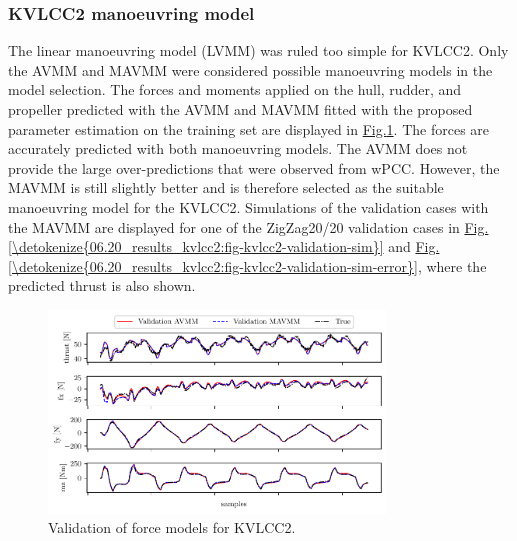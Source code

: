 \subsubsection{KVLCC2 manoeuvring model}
\label{\detokenize{06.20_results_kvlcc2:kvlcc2-manoeuvring-model}}
The linear manoeuvring model (LVMM) was ruled too simple for KVLCC2. Only the AVMM and MAVMM were considered possible manoeuvring models in the model selection.
The forces and moments applied on the hull, rudder, and propeller predicted with the AVMM and MAVMM fitted with the proposed parameter estimation on the training set are displayed in \hyperref[\detokenize{06.20_results_kvlcc2:fig-kvlcc2-validation-forces}]{Fig.\@ \ref{\detokenize{06.20_results_kvlcc2:fig-kvlcc2-validation-forces}}}.
The forces are accurately predicted with both manoeuvring models. The AVMM does not provide the large over-predictions that were observed from wPCC. However, the MAVMM is still slightly better and is therefore selected as the suitable manoeuvring model for the KVLCC2.
Simulations of the validation cases with the MAVMM are displayed for one of the ZigZag20/20 validation cases in \hyperref[\detokenize{06.20_results_kvlcc2:fig-kvlcc2-validation-sim}]{Fig.\@ \ref{\detokenize{06.20_results_kvlcc2:fig-kvlcc2-validation-sim}}} and \hyperref[\detokenize{06.20_results_kvlcc2:fig-kvlcc2-validation-sim-error}]{Fig.\@ \ref{\detokenize{06.20_results_kvlcc2:fig-kvlcc2-validation-sim-error}}}, where the predicted thrust is also shown.

\begin{figure}[h!]
\centering
\includegraphics[width=0.8\textwidth]{kappa/images/14.pdf}
\caption{Validation of force models for KVLCC2.}\label{\detokenize{06.20_results_kvlcc2:fig-kvlcc2-validation-forces}}\end{figure}

